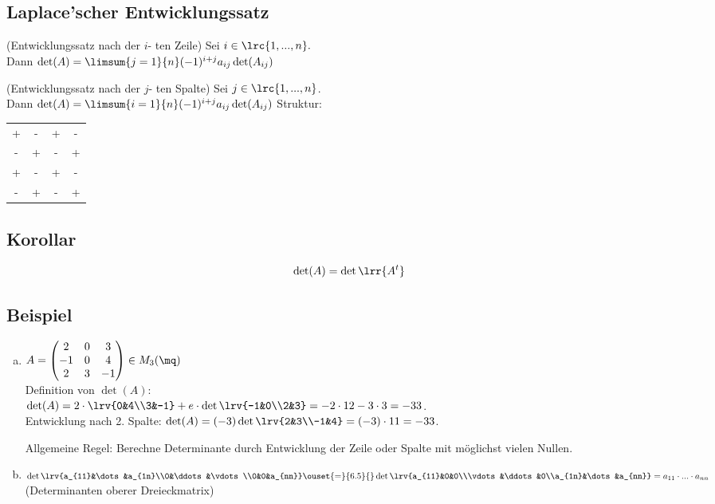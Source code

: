 \subsection{Laplace'scher Entwicklungssatz}
    \item (Entwicklungssatz nach der $i$- ten Zeile)
      Sei $i\in\lrc{1,...,n}.$\\
      Dann $\det(A)=\limsum{j=1}{n}(-1)^{i+j}a_{ij}\det(A_{ij})$
    \item (Entwicklungssatz nach der $j$- ten Spalte)
      Sei $j\in\lrc{1,...,n}$.\\
      Dann $\det(A)=\limsum{i=1}{n}(-1)^{i+j}a_{ij}\det(A_{ij})$
  \subExEnd
  Struktur:\begin{tabular}{cccc}+&-&+&-\\-&+&-&+\\+&-&+&-\\-&+&-&+\end{tabular}

\subsection{Korollar}
  \[\det(A)=\det\lrr{A^t}\]

\subsection{Beispiel}
  \begin{enumerate}[a)]
    \item $A=\begin{pmatrix}2&0&3\\-1&0&4\\2&3&-1\end{pmatrix}\in M_3(\mq)$\\
      Definition von $\det(A)$:\\
      $\det(A)=2\cdot\lrv{0&4\\3&-1}+e\cdot\det\lrv{-1&0\\2&3}=-2\cdot
      12-3\cdot 3=-33$.\\ Entwicklung nach 2. Spalte:
      $\det(A)=(-3)\det\lrv{2&3\\-1&4}=(-3)\cdot 11=-33$.

      Allgemeine Regel: Berechne Determinante durch Entwicklung der Zeile oder
      Spalte mit möglichst vielen Nullen.

    \item
      $\det\lrv{a_{11}&\dots&a_{1n}\\0&\ddots&\vdots\\0&0&a_{nn}}\ouset{=}{6.5}{}\det\lrv{a_{11}&0&0\\\vdots&\ddots&0\\a_{1n}&\dots&a_{nn}}=a_{11}\cdot...\cdot a_{nn}$\\
      (Determinanten oberer Dreieckmatrix)
  \end{enumerate}
